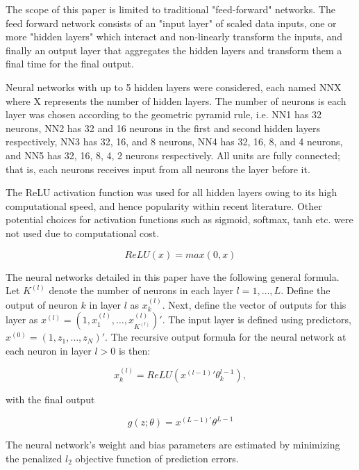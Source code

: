 \documentclass[man, a4paper, biblatex]{apa6}
\begin{document}
The scope of this paper is limited to traditional "feed-forward" networks. The feed forward network consists of an "input layer" of scaled data inputs, one or more "hidden layers" which interact and non-linearly transform the inputs, and finally an output layer that aggregates the hidden layers and transform them a final time for the final output. 

Neural networks with up to 5 hidden layers were considered, each named NNX where X represents the number of hidden layers. The number of neurons is each layer was chosen according to the geometric pyramid rule, i.e. NN1 has 32 neurons, NN2 has 32 and 16 neurons in the first and second hidden layers respectively, NN3 has 32, 16, and 8 neurons, NN4 has 32, 16, 8, and 4 neurons, and NN5 has 32, 16, 8, 4, 2 neurons respectively. All units are fully connected; that is, each neurons receives input from all neurons the layer before it.

The ReLU activation function was used for all hidden layers owing to its high computational speed, and hence popularity within recent literature. Other potential choices for activation functions such as sigmoid, softmax, tanh etc. were not used due to computational cost.

\begin{equation}
	ReLU(x) = max(0, x)
\end{equation}

The neural networks detailed in this paper have the following general formula. Let $K^(l)$ denote the number of neurons in each layer $l = 1, \dots, L$. Define the output of neuron $k$ in layer $l$ as $x_k^(l)$. Next, define the vector of outputs for this layer as $x^(l) = (1, x_1^(l), \dots, x_{K^(l)}^(l))'$. The input layer is defined using predictors, $x^(0) = (1, z_1, \dots, z_N)'$. The recursive output formula for the neural network at each neuron in layer $l > 0$ is then:

\begin{equation}
	x_k^(l) = ReLU(x^(l-1)'\theta_k^{l-1}),
\end{equation}

with the final output

\begin{equation}
	g(z;\theta) = x^{(L-1)'}\theta^{L-1}
\end{equation}

The neural network's weight and bias parameters are estimated by minimizing the penalized $l_2$ objective function of prediction errors.
\end{document}
